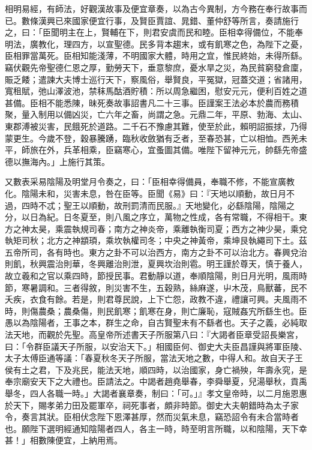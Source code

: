 \begin{pinyinscope}
相明易經，有師法，好觀漢故事及便宜章奏，以為古今異制，方今務在奉行故事而已。數條漢興已來國家便宜行事，及賢臣賈誼、晁錯、董仲舒等所言，奏請施行之，曰：「臣聞明主在上，賢輔在下，則君安虞而民和睦。臣相幸得備位，不能奉明法，廣教化，理四方，以宣聖德。民多背本趨末，或有飢寒之色，為陛下之憂，臣相罪當萬死。臣相知能淺薄，不明國家大體，時用之宜，惟民終始，未得所繇。竊伏觀先帝聖德仁恩之厚，勤勞天下，垂意黎庶，憂水旱之災，為民貧窮發倉廩，賑乏餧；遣諫大夫博士巡行天下，察風俗，舉賢良，平冤獄，冠蓋交道；省諸用，寬租賦，弛山澤波池，禁秣馬酤酒貯積：所以周急繼困，慰安元元，便利百姓之道甚備。臣相不能悉陳，昧死奏故事詔書凡二十三事。臣謹案王法必本於農而務積聚，量入制用以備凶災，亡六年之畜，尚謂之急。元鼎二年，平原、勃海、太山、東郡溥被災害，民餓死於道路。二千石不豫慮其難，使至於此，賴明詔振捄，乃得蒙更生。今歲不登，穀暴騰踴，臨秋收斂猶有乏者，至春恐甚，亡以相恤。西羌未平，師旅在外，兵革相乘，臣竊寒心，宜蚤圖其備。唯陛下留神元元，帥繇先帝盛德以撫海內。」上施行其策。

又數表采易陰陽及明堂月令奏之，曰：「臣相幸得備員，奉職不修，不能宣廣教化。陰陽未和，災害未息，咎在臣等。臣聞《易》曰：『天地以順動，故日月不過，四時不忒；聖王以順動，故刑罰清而民服。』天地變化，必繇陰陽，陰陽之分，以日為紀。日冬夏至，則八風之序立，萬物之性成，各有常職，不得相干。東方之神太昊，乘震執規司春；南方之神炎帝，乘離執衡司夏；西方之神少昊，乘兌執矩司秋；北方之神顓頊，乘坎執權司冬；中央之神黃帝，乘坤艮執繩司下土。茲五帝所司，各有時也。東方之卦不可以治西方，南方之卦不可以治北方。春興兌治則飢，秋興震治則華，冬興離治則泄，夏興坎治則雹。明王謹於尊天，慎于養人，故立羲和之官以乘四時，節授民事。君動靜以道，奉順陰陽，則日月光明，風雨時節，寒暑調和。三者得敘，則災害不生，五穀熟，絲麻遂，屮木茂，鳥獸蕃，民不夭疾，衣食有餘。若是，則君尊民說，上下亡怨，政教不違，禮讓可興。夫風雨不時，則傷農桑；農桑傷，則民飢寒；飢寒在身，則亡廉恥，寇賊姦宄所繇生也。臣愚以為陰陽者，王事之本，群生之命，自古賢聖未有不繇者也。天子之義，必純取法天地，而觀於先聖。高皇帝所述書天子所服第八曰：『大謁者臣章受詔長樂宮，曰：「令群臣議天子所服，以安治天下。」相國臣何、御史大夫臣昌謹與將軍臣陵、太子太傅臣通等議：「春夏秋冬天子所服，當法天地之數，中得人和。故自天子王侯有土之君，下及兆民，能法天地，順四時，以治國家，身亡禍殃，年壽永究，是奉宗廟安天下之大禮也。臣請法之。中謁者趙堯舉春，李舜舉夏，兒湯舉秋，貢禹舉冬，四人各職一時。」大謁者襄章奏，制曰：「可。」』孝文皇帝時，以二月施恩惠於天下，賜孝弟力田及罷軍卒，祠死事者，頗非時節。御史大夫朝錯時為太子家令，奏言其狀。臣相伏念陛下恩澤甚厚，然而災氣未息，竊恐詔令有未合當時者也。願陛下選明經通知陰陽者四人，各主一時，時至明言所職，以和陰陽，天下幸甚！」相數陳便宜，上納用焉。


\end{pinyinscope}
